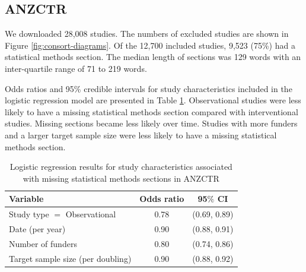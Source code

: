 \documentclass[12pt]{article}
\begin{document}
\subsection{ANZCTR}

We downloaded 28,008 studies. The numbers of excluded studies are shown
in Figure \ref{fig:consort-diagrams}. Of the 12,700 included studies,
9,523 (75\%) had a statistical methods section. The median length of
sections was 129 words with an inter-quartile range of 71 to 219 words.

Odds ratios and 95\% credible intervals for study characteristics
included in the logistic regression model are presented in Table
\ref{tab:anzctr-missing-odds}. Observational studies were less likely to
have a missing statistical methods section compared with interventional
studies. Missing sections became less likely over time. Studies with
more funders and a larger target sample size were less likely to have a
missing statistical methods section.

\begin{table}[]
\centering
\caption{Logistic regression results for study characteristics associated with missing statistical methods sections in ANZCTR}
\label{tab:anzctr-missing-odds}
\begin{tabular}{lcc}
\hline
Variable & Odds ratio & 95$\%$ CI \\
\hline
Study type $=$ Observational & 0.78 & (0.69, 0.89) \\
Date (per year) & 0.90 & (0.88, 0.91) \\
Number of funders & 0.80 & (0.74, 0.86) \\
Target sample size (per doubling) & 0.90 & (0.88, 0.92)\\
\hline
\end{tabular}
\end{table}
\end{document}
